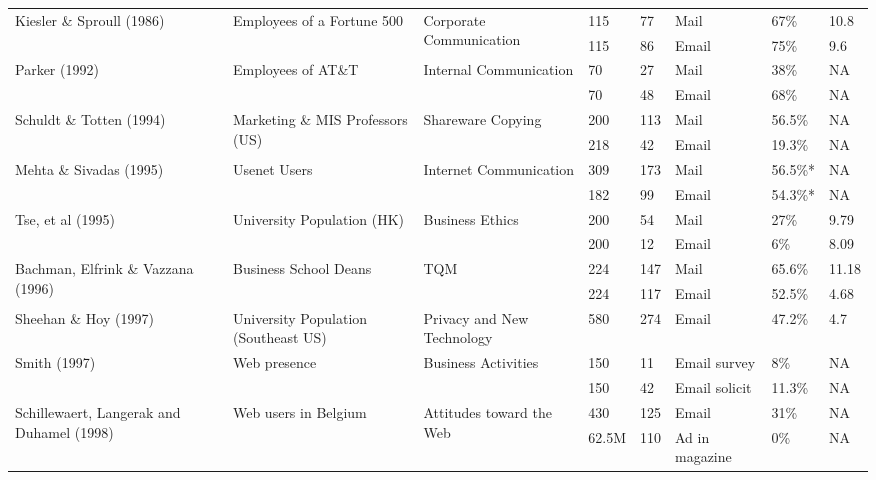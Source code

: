 \begin{center}
\begin{longtable}{ | p{2cm} | p{2cm} | p{2cm} | p{0.75cm} | p{0.75cm} | p{1cm} | p{1cm} | p{0.5cm} | }
	
    \multirow{2}{2cm}{Kiesler \& Sproull (1986)}  & \multirow{2}{2cm}{Employees of a Fortune 500} & \multirow{2}{2cm}{Corporate Communication} & 115 & 77 & Mail & 67\% & 10.8 \\ \cline{4-8}
	&  &  & 115 & 86 & Email & 75\% & 9.6 \\ \hline
    \multirow{2}{2cm}{Parker (1992)}  & \multirow{2}{2cm}{Employees of AT\&T} & \multirow{2}{2cm}{Internal Communication} & 70 & 27 & Mail & 38\% & NA \\ \cline{4-8}
	&  &  & 70 & 48 & Email & 68\% & NA \\ \hline
    \multirow{2}{2cm}{Schuldt \& Totten (1994)}  & \multirow{2}{2cm}{Marketing \& MIS Professors (US)} & \multirow{2}{2cm}{Shareware Copying} & 200 & 113 & Mail & 56.5\% & NA \\ \cline{4-8}
	&  &  & 218 & 42 & Email & 19.3\% & NA \\ \hline
    \multirow{2}{2cm}{Mehta \& Sivadas (1995)}  & \multirow{2}{2cm}{Usenet Users} & \multirow{2}{2cm}{Internet Communication} & 309 & 173 & Mail & 56.5\%* & NA \\ \cline{4-8}
	&  &  & 182 & 99 & Email & 54.3\%* & NA \\ \hline
    \multirow{2}{2cm}{Tse, et al (1995)}  & \multirow{2}{2cm}{University Population (HK)} & \multirow{2}{2cm}{Business Ethics} & 200 & 54 & Mail & 27\% & 9.79 \\ \cline{4-8}
	&  &  & 200 & 12 & Email & 6\% & 8.09 \\ \hline
    \multirow{2}{2cm}{Bachman, Elfrink \& Vazzana (1996)} & \multirow{2}{2cm}{Business School Deans} & \multirow{2}{2cm}{TQM} & 224 & 147 & Mail & 65.6\% & 11.18 \\ \cline{4-8}
	&  &  & 224 & 117 & Email & 52.5\% & 4.68 \\ \hline
    Sheehan \& Hoy (1997) & University Population (Southeast US) & Privacy and New Technology & 580 & 274 & Email & 47.2\% & 4.7 \\ \hline
    \multirow{2}{2cm}{Smith (1997)} & \multirow{2}{2cm}{Web presence} & \multirow{2}{2cm}{Business Activities} & 150 & 11 & Email survey & 8\% & NA \\ \cline{4-8}
	&  &  & 150 & 42 & Email solicit & 11.3\% & NA \\ \hline
	\multirow{4}{2cm}{Schillewaert, Langerak and Duhamel (1998)} & \multirow{4}{2cm}{Web users in Belgium} & \multirow{4}{2cm}{Attitudes toward the Web} & 430 & 125 & Email & 31\% & NA \\ \cline{4-8}
	&  &  & 62.5M & 110 & Ad in magazine & 0\% & NA \\ \cline{4-8}

\end{longtable}
\end{center}

